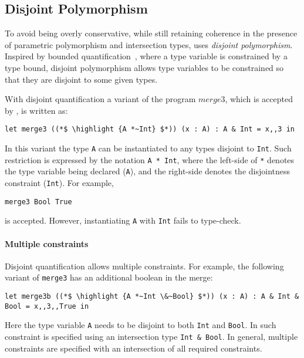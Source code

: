 \subsection{Disjoint Polymorphism}\label{subsec:disjoint-quantification}
To avoid being overly conservative, while still retaining coherence in the
presence of parametric polymorphism and intersection types, \name uses
\emph{disjoint polymorphism}.
Inspired by bounded quantification~\cite{Cardelli:1994},
where a type variable is constrained by a type bound, disjoint polymorphism 
allows type variables to be constrained so that they are disjoint to some
given types. 

With disjoint quantification a variant of the program $merge3$, which
is accepted by \name, is written as:

\begin{lstlisting}
let merge3 ((*$ \highlight {A *~Int} $*)) (x : A) : A & Int = x,,3 in
\end{lstlisting}

\noindent In this variant the type \lstinline{A} can be instantiated
to any types disjoint to \lstinline{Int}. Such restriction is
expressed by the notation \lstinline{A * Int}, where the left-side of 
\lstinline{*} denotes the type variable being declared (\lstinline{A}), and the
right-side denotes the disjointness constraint (\lstinline{Int}).
For example, 

\begin{lstlisting}
merge3 Bool True
\end{lstlisting}

\noindent is accepted. However, instantiating \lstinline{A} with
\lstinline{Int} fails to type-check. 

\paragraph{Multiple constraints} Disjoint quantification allows 
multiple constraints. For example, the following variant of 
\lstinline{merge3} has an additional boolean in the merge:

\begin{lstlisting}
let merge3b ((*$ \highlight {A *~Int \&~Bool} $*)) (x : A) : A & Int & Bool = x,,3,,True in
\end{lstlisting}

\noindent Here the type variable \lstinline{A} needs to be
disjoint to both \lstinline{Int} and \lstinline{Bool}. In \name
such constraint is specified using an intersection type
\lstinline{Int & Bool}. In general, multiple constraints are specified 
with an intersection of all required constraints. 

